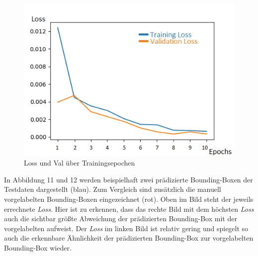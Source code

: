 \begin{figure}[!htb] 
  \centering
  \includegraphics[width=13.8cm]{Abb/training_progress.png}
  \caption{Loss und Val über Trainingsepochen}
  \label{lossbild}
\end{figure} 
In Abbildung 11 und 12 werden beispielhaft zwei prädizierte Bounding-Boxen der Testdaten dargestellt (blau). Zum Vergleich sind zusätzlich die manuell vorgelabelten Bounding-Boxen eingezeichnet (rot). Oben im Bild steht der jeweils errechnete \textit{Loss}. Hier ist zu erkennen, dass das rechte Bild mit dem höchsten \textit{Loss} auch die sichtbar größte Abweichung der prädizierten Bounding-Box mit der vorgelabelten aufweist. Der \textit{Loss} im linken Bild ist relativ gering und spiegelt so auch die erkennbare Ähnlichkeit der prädizierten Bounding-Box zur vorgelabelten Bounding-Box wieder.\\ \label{pred_boxes}
